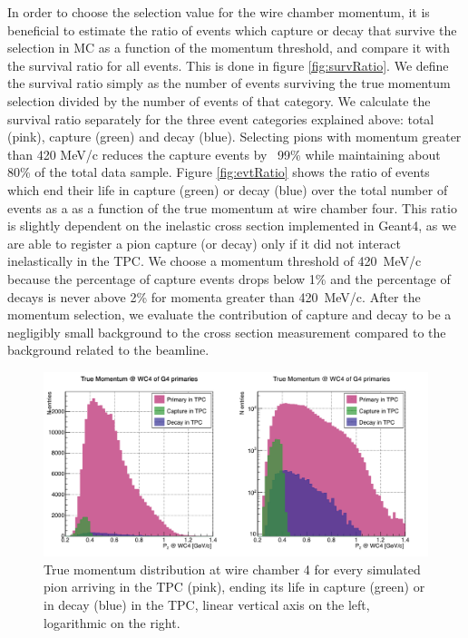 In order to choose the selection value for the wire chamber momentum, it is beneficial to estimate the ratio of events which capture or decay that survive the selection in MC as a function of the momentum threshold, and compare it with the survival ratio for all events. This is done in figure \ref{fig:survRatio}. We define the survival ratio simply  as the number of events surviving the true momentum selection divided by the number of events of that category. We calculate the survival ratio separately for the three event categories explained above: total (pink), capture (green) and decay (blue).
Selecting pions with momentum greater than 420 MeV/c reduces the capture events by ~99\% while maintaining about 80\% of the total data sample. 
Figure \ref{fig:evtRatio} shows the ratio of events which end their life in capture (green) or decay (blue) over the total number of events as a as a function of the true momentum at wire chamber four. This ratio is slightly dependent on the inelastic cross section implemented in Geant4, as we are able to register a pion capture (or decay) only if it did not interact inelastically in the TPC. We choose a momentum threshold of 420~MeV/c because the percentage of capture events drops below 1\% and the percentage of decays is never above 2\% for momenta greater than 420~MeV/c. After the momentum selection, we evaluate the contribution of capture and decay to be a negligibly small background to the cross section measurement compared to the background related to the beamline.

\begin{figure}[]
\centering
\includegraphics[width=15cm]{Chapter-7/Images/CDAsMomentumFunct.png}
\caption{True momentum distribution at wire chamber 4 for every simulated pion arriving in the TPC (pink), ending its life in capture (green) or in decay (blue) in the TPC, linear vertical axis on the left, logarithmic on the right. }
\label{fig:CaptureMom}
\end{figure}

